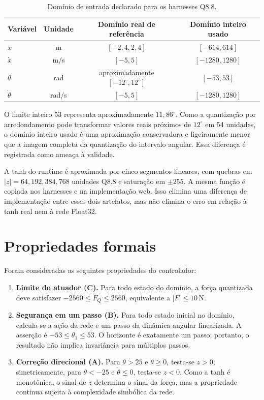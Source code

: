 \begin{table}[H]
\centering
\caption{Domínio de entrada declarado para os harnesses Q8.8.}
\label{tab:dominio-q88}
\begin{tabular}{lccc}
\toprule
Variável & Unidade & Domínio real de referência & Domínio inteiro usado \\
\midrule
\(x\) & m & \([-2{,}4,2{,}4]\) & \([-614,614]\) \\
\(\dot{x}\) & m/s & \([-5,5]\) & \([-1280,1280]\) \\
\(\theta\) & rad & aproximadamente \([-12^\circ,12^\circ]\) & \([-53,53]\) \\
\(\dot{\theta}\) & rad/s & \([-5,5]\) & \([-1280,1280]\) \\
\bottomrule
\end{tabular}
\end{table}

O limite inteiro \(53\) representa aproximadamente \(11{,}86^\circ\). Como a
quantização por arredondamento pode transformar valores reais próximos de
\(12^\circ\) em 54 unidades, o domínio inteiro usado é uma aproximação
conservadora e ligeiramente menor que a imagem completa da quantização do
intervalo angular. Essa diferença é registrada como ameaça à validade.

A tanh do runtime é aproximada por cinco segmentos lineares, com quebras em
\(|z|=64,192,384,768\) unidades Q8.8 e saturação em \(\pm255\). A mesma função
é copiada nos harnesses e na implementação web. Isso elimina uma diferença de
implementação entre esses dois artefatos, mas não elimina o erro em relação à
tanh real nem à rede Float32.

\section{Propriedades formais}

Foram consideradas as seguintes propriedades do controlador:

\begin{enumerate}
  \item \textbf{Limite do atuador (C).} Para todo estado do domínio, a força
  quantizada deve satisfazer \(-2560\leq F_Q\leq2560\), equivalente a
  \(|F|\leq10\,\mathrm{N}\).
  \item \textbf{Segurança em um passo (B).} Para todo estado inicial no domínio,
  calcula-se a ação da rede e um passo da dinâmica angular linearizada. A
  asserção é \(-53\leq\theta_1\leq53\). O horizonte é exatamente um passo;
  portanto, o resultado não implica invariância para múltiplos passos.
  \item \textbf{Correção direcional (A).} Para \(\theta>25\) e
  \(\dot{\theta}\geq0\), testa-se \(z>0\); simetricamente, para
  \(\theta<-25\) e \(\dot{\theta}\leq0\), testa-se \(z<0\). Como a tanh é
  monotônica, o sinal de \(z\) determina o sinal da força, mas a propriedade
  continua sujeita à complexidade simbólica da rede.
\end{enumerate}

